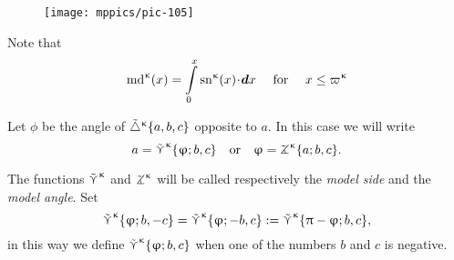 \begin{wrapfigure}{r}{43mm}
\centering
\texttt{[image: mppics/pic-105]}
\end{wrapfigure}


Note that
\[
\mdk(x)=\int\limits_0^x
\snk(x)\cdot\dd x \quad \text{ for }\quad x\le \varpi\kappa
\]

Let $\phi$ be the angle of ${\tilde\triangle}^{\upkappa}\{a,b,c\}$  
opposite to $a$.
In this case we will write \label{page:model-side}\index{$\side\kappa$!$\side\kappa \{{*};{*},{*}\}$}
\[a
=
\side\kappa\{\phi;b,c\}
\quad  \text{or}\quad 
\phi
=
\tangle\mc\kappa\{a;b,c\}.\]

The functions $\side\kappa$ and $\tangle\mc\kappa$ will be called respectively the \emph{model side} and the \emph{model angle}.
Set 
\[
\mathop{\tilde\curlyvee}\nolimits^{\upkappa}\{\upvarphi;b,-c\}
=\mathop{\tilde\curlyvee}\nolimits^{\upkappa}\{\upvarphi;-b,c\}
:=\mathop{\tilde\curlyvee}\nolimits^{\upkappa}\{\uppi-\upvarphi;b,c\},\]
in this way we define $\mathop{\tilde\curlyvee}\nolimits^{\upkappa}\{\upvarphi;b,c\}$ when one of the numbers  $b$ and $c$ is negative. %


